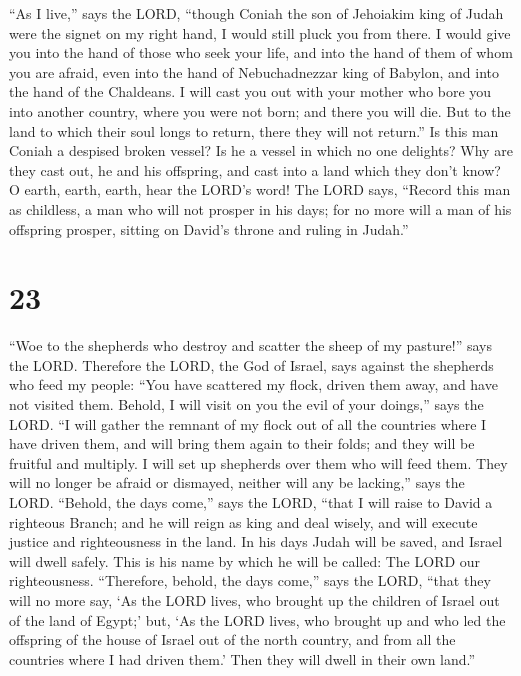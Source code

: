  ``As I live,'' says the LORD, ``though Coniah the son of
Jehoiakim king of Judah were the signet on my right hand, I would still
pluck you from there.  I would give you into the hand of
those who seek your life, and into the hand of them of whom you are
afraid, even into the hand of Nebuchadnezzar king of Babylon, and into
the hand of the Chaldeans.  I will cast you out with your
mother who bore you into another country, where you were not born; and
there you will die.  But to the land to which their soul
longs to return, there they will not return.''  Is this man
Coniah a despised broken vessel? Is he a vessel in which no one
delights? Why are they cast out, he and his offspring, and cast into a
land which they don't know?  O earth, earth, earth, hear
the LORD's word!  The LORD says, ``Record this man as
childless, a man who will not prosper in his days; for no more will a
man of his offspring prosper, sitting on David's throne and ruling in
Judah.''

\hypertarget{section-22}{%
\section{23}\label{section-22}}

 ``Woe to the shepherds who destroy and scatter the sheep of
my pasture!'' says the LORD.  Therefore the LORD, the God of
Israel, says against the shepherds who feed my people: ``You have
scattered my flock, driven them away, and have not visited them. Behold,
I will visit on you the evil of your doings,'' says the LORD.
 ``I will gather the remnant of my flock out of all the
countries where I have driven them, and will bring them again to their
folds; and they will be fruitful and multiply.  I will set
up shepherds over them who will feed them. They will no longer be afraid
or dismayed, neither will any be lacking,'' says the LORD. 
``Behold, the days come,'' says the LORD, ``that I will raise to David a
righteous Branch; and he will reign as king and deal wisely, and will
execute justice and righteousness in the land.  In his days
Judah will be saved, and Israel will dwell safely. This is his name by
which he will be called: The LORD our righteousness. 
``Therefore, behold, the days come,'' says the LORD, ``that they will no
more say, `As the LORD lives, who brought up the children of Israel out
of the land of Egypt;'  but, `As the LORD lives, who brought
up and who led the offspring of the house of Israel out of the north
country, and from all the countries where I had driven them.' Then they
will dwell in their own land.''

